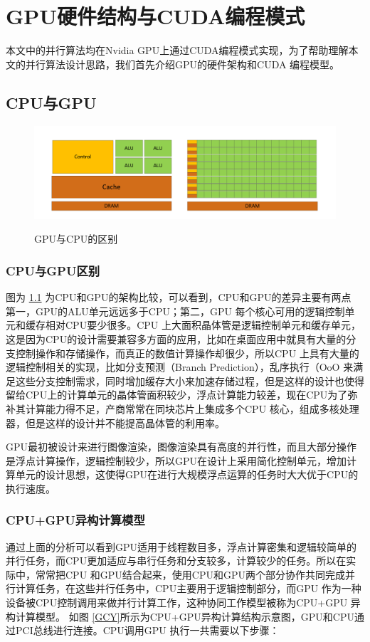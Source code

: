 \chapter{GPU硬件结构与CUDA编程模式}
本文中的并行算法均在Nvidia GPU上通过CUDA编程模式实现，为了帮助理解本文的并行算法设计思路，我们首先介绍GPU的硬件架构和CUDA 编程模型。
\section{CPU与GPU}
\begin{figure}
\setlength{\belowcaptionskip}{-0.5cm}
\begin{center}
{\includegraphics[width=1 \textwidth]{figures/GPU&CPU.pdf}}
\end{center}
\caption{{\footnotesize{GPU与CPU的区别}}}
\label{GCD}
\end{figure}
\subsection{CPU与GPU区别}

图为 \ref{GCD} 为CPU和GPU的架构比较，可以看到，CPU和GPU的差异主要有两点 第一，GPU的ALU单元远远多于CPU；第二，GPU 每个核心可用的逻辑控制单元和缓存相对CPU要少很多。CPU 上大面积晶体管是逻辑控制单元和缓存单元，这是因为CPU的设计需要兼容多方面的应用，比如在桌面应用中就具有大量的分支控制操作和存储操作，而真正的数值计算操作却很少，所以CPU 上具有大量的逻辑控制相关的实现，比如分支预测（Branch Prediction），乱序执行（OoO 来满足这些分支控制需求，同时增加缓存大小来加速存储过程，但是这样的设计也使得留给CPU上的计算单元的晶体管面积较少，浮点计算能力较差，现在CPU为了弥补其计算能力得不足，产商常常在同块芯片上集成多个CPU 核心，组成多核处理器，但是这样的设计并不能提高晶体管的利用率。

GPU最初被设计来进行图像渲染，图像渲染具有高度的并行性，而且大部分操作是浮点计算操作，逻辑控制较少，所以GPU在设计上采用简化控制单元，增加计算单元的设计思想，这使得GPU在进行大规模浮点运算的任务时大大优于CPU的执行速度。
\subsection{CPU+GPU异构计算模型}
通过上面的分析可以看到GPU适用于线程数目多，浮点计算密集和逻辑较简单的并行任务，而CPU更加适应与串行任务和分支较多，计算较少的任务。所以在实际中，常常把CPU 和GPU结合起来，使用CPU和GPU两个部分协作共同完成并行计算任务，在这些并行任务中，CPU主要用于逻辑控制部分，而GPU 作为一种设备被CPU控制调用来做并行计算工作，这种协同工作模型被称为CPU+GPU 异构计算模型。
如图 \ref{GCY}所示为CPU+GPU异构计算结构示意图，GPU和CPU通过PCI总线进行连接。CPU调用GPU 执行一共需要以下步骤：

